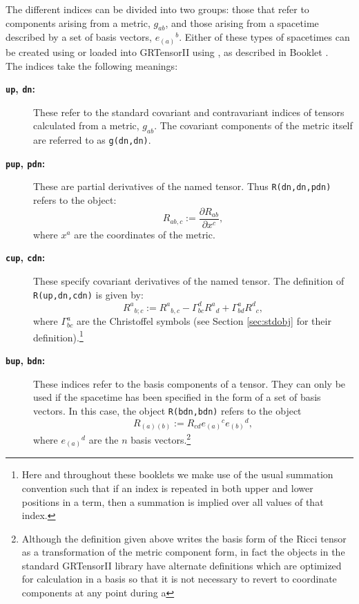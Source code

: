 \documentclass{article}
\begin{document}
The different indices can be divided into two groups: those that refer
to components arising from a metric, $g_{ab}$, and those arising from
a spacetime described by a set of basis vectors, $e_{(a)}{}^b$. Either
of these types of spacetimes can be created using  or loaded
into GRTensorII using , as described in Booklet \grMakegRef.\\

The indices take the following meanings:
\begin{description}
  \item[\textbf{\texttt{up}, \texttt{dn}:}] 
    These refer to the standard covariant and
    contravariant indices of tensors calculated from a metric, $g_{ab}$. 
    The covariant components of the metric itself are referred to as 
    \texttt{g(dn,dn)}.
  \item[\textbf{\texttt{pup}, \texttt{pdn}:}] 
    These are partial derivatives of the
    named tensor. Thus \texttt{R(dn,dn,pdn)} refers to the object:
    \[
      R_{ab,c} := \frac{\partial R_{ab}}{\partial x^c},
    \]
    where $x^a$ are the coordinates of the metric.
  \item[\textbf{\texttt{cup}, \texttt{cdn}:}] 
    These specify covariant derivatives
    of the named tensor. The definition of \texttt{R(up,dn,cdn)} is given
    by:
    \[
      R^a{}_{b;c} := R^a{}_{b,c} - \Gamma^d_{bc} R^a{}_d + 
        \Gamma^a_{bd} R^d{}_c,
    \]
    where $\Gamma^a_{bc}$ are the Christoffel symbols (see Section 
    \ref{sec:stdobj} for their definition).\footnote{Here and 
    throughout these booklets we make use of the usual summation
    convention such that if an index is repeated in both upper and lower 
    positions in a term, then a summation is implied over all values of
    that index.}   
  \item[\textbf{\texttt{bup}, \texttt{bdn}:}] These indices refer to the basis
    components of a tensor. They can only be used if the spacetime has
    been specified in the form of a set of basis vectors. In this case,
    the object \texttt{R(bdn,bdn)} refers to the object
    \[
      R_{(a)(b)} := R_{cd} e_{(a)}{}^c e_{(b)}{}^d,
    \]
    where $e_{(a)}{}^d$ are the $n$ basis vectors.\footnote{Although
    the definition given above writes the basis form of the Ricci
    tensor as a transformation of the metric component form, in fact the
    objects in the standard GRTensorII library have alternate definitions
    which are optimized for calculation in a basis so that it is not
    necessary to revert to coordinate components at any point during a
}
\end{description}
\end{document}
